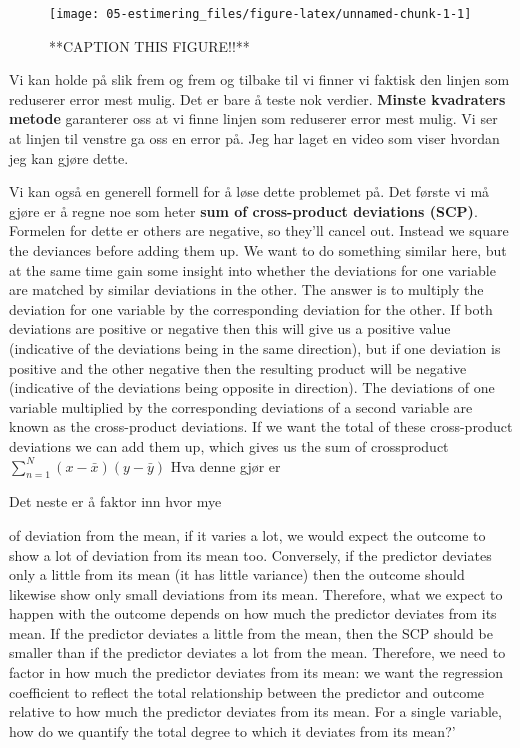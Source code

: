 \documentclass[
]{book}
\begin{document}
\begin{figure}

{\centering \texttt{[image: 05-estimering\_files/figure-latex/unnamed-chunk-1-1]} 

}

\caption{**CAPTION THIS FIGURE!!**}\label{fig:unnamed-chunk-1}
\end{figure}

Vi kan holde på slik frem og frem og tilbake til vi finner vi faktisk den linjen som reduserer error mest mulig. Det er bare å teste nok verdier. \textbf{Minste kvadraters metode} garanterer oss at vi finne linjen som reduserer error mest mulig. Vi ser at linjen til venstre ga oss en error på. Jeg har laget en video som viser hvordan jeg kan gjøre dette.

Vi kan også en generell formell for å løse dette problemet på. Det første vi må gjøre er å regne noe som heter \textbf{sum of cross-product deviations (SCP)}. Formelen for dette er others are negative, so they'll cancel out. Instead we
square the deviances before adding them up. We want to do something similar here, but at the
same time gain some insight into whether the deviations for one variable are matched by similar
deviations in the other. The answer is to multiply the deviation for one variable by the corresponding
deviation for the other. If both deviations are positive or negative then this will give us
a positive value (indicative of the deviations being in the same direction), but if one deviation is
positive and the other negative then the resulting product will be negative (indicative of the
deviations being opposite in direction). The deviations of one variable multiplied by the corresponding
deviations of a second variable are known as the cross-product deviations. If we want
the total of these cross-product deviations we can add them up, which gives us the sum of crossproduct
\(\sum_{n=1}^N (x - \bar{x})(y- \bar{y})\) Hva denne gjør er

Det neste er å faktor inn hvor mye

of deviation from the mean, if it varies a lot, we would expect the outcome
to show a lot of deviation from its mean too. Conversely, if the predictor deviates only a little from
its mean (it has little variance) then the outcome should likewise show only small deviations from
its mean. Therefore, what we expect to happen with the outcome depends on how much the predictor
deviates from its mean. If the predictor deviates a little from the mean, then the SCP should be
smaller than if the predictor deviates a lot from the mean. Therefore, we need to factor in how much
the predictor deviates from its mean: we want the regression coefficient to reflect the total relationship
between the predictor and outcome relative to how much the predictor deviates from its mean.
For a single variable, how do we quantify the total degree to which it deviates from its mean?'

  
\end{document}
